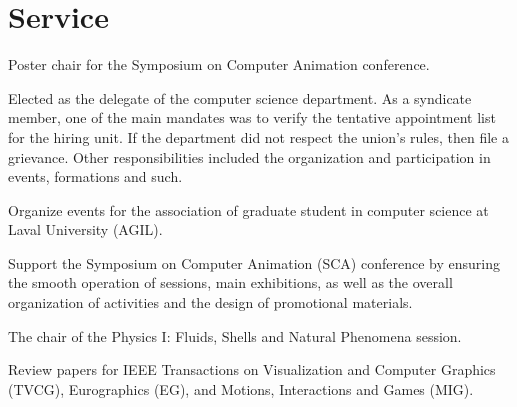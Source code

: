 \documentclass[10pt]{article} %
\begin{document}




\section{Service}
{
Poster chair for the Symposium on Computer Animation conference.\\
}

{
Elected as the delegate of the computer science department. As a syndicate member, one of the main mandates was to verify the tentative appointment list for the hiring unit. If the department did not respect the union's rules, then file a grievance. Other responsibilities included the organization and participation in events, formations and such.\\
}

{
Organize events for the association of graduate student in computer science at Laval University (AGIL).\\
}

{
Support the Symposium on Computer Animation (SCA) conference by ensuring the smooth operation of sessions, main exhibitions, as well as the overall organization of activities and the design of promotional materials.\\
}

{
The chair of the Physics I: Fluids, Shells and Natural Phenomena session.\\
}

{
Review papers for IEEE Transactions on Visualization and Computer Graphics (TVCG), Eurographics (EG), and Motions, Interactions and Games (MIG).\\
}


\end{document}
